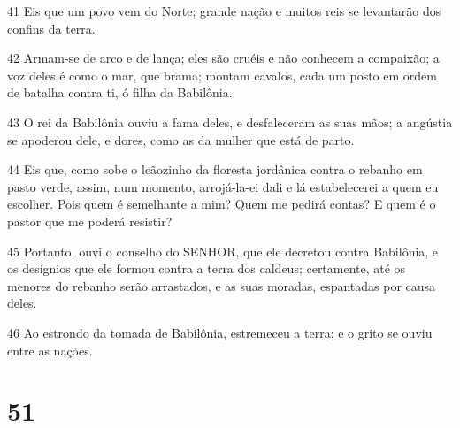 \par 41 Eis que um povo vem do Norte; grande nação e muitos reis se levantarão dos confins da terra.
\par 42 Armam-se de arco e de lança; eles são cruéis e não conhecem a compaixão; a voz deles é como o mar, que brama; montam cavalos, cada um posto em ordem de batalha contra ti, ó filha da Babilônia.
\par 43 O rei da Babilônia ouviu a fama deles, e desfaleceram as suas mãos; a angústia se apoderou dele, e dores, como as da mulher que está de parto.
\par 44 Eis que, como sobe o leãozinho da floresta jordânica contra o rebanho em pasto verde, assim, num momento, arrojá-la-ei dali e lá estabelecerei a quem eu escolher. Pois quem é semelhante a mim? Quem me pedirá contas? E quem é o pastor que me poderá resistir?
\par 45 Portanto, ouvi o conselho do SENHOR, que ele decretou contra Babilônia, e os desígnios que ele formou contra a terra dos caldeus; certamente, até os menores do rebanho serão arrastados, e as suas moradas, espantadas por causa deles.
\par 46 Ao estrondo da tomada de Babilônia, estremeceu a terra; e o grito se ouviu entre as nações.

\chapter{51}

